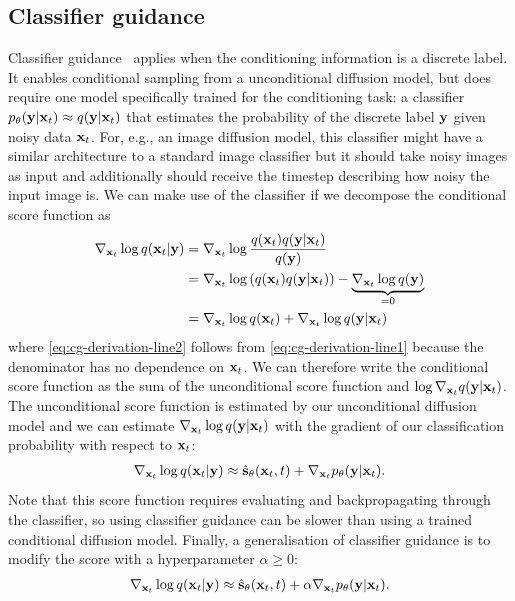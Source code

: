 \subsection{Classifier guidance}
Classifier guidance~\citep{song2020score} applies when the conditioning information is a discrete label. It enables conditional sampling from a unconditional diffusion model, but does require one model specifically trained for the conditioning task: a classifier $p_\theta({\mathbf{y}}|{\mathbf{x}}_t) \approx q({\mathbf{y}}|{\mathbf{x}}_t)$ that estimates the probability of the discrete label ${\mathbf{y}}$ given noisy data ${\mathbf{x}}_t$. For, e.g., an image diffusion model, this classifier might have a similar architecture to a standard image classifier but it should take noisy images as input and additionally should receive the timestep describing how noisy the input image is. We can make use of the classifier if we decompose the conditional score function as
\begin{align}
    \nabla_{{\mathbf{x}}_t} \log q({\mathbf{x}}_t|{\mathbf{y}}) &= \nabla_{{\mathbf{x}}_t} \log \frac{q({\mathbf{x}}_t)q({\mathbf{y}}|{\mathbf{x}}_t)}{q({\mathbf{y}})} \label{eq:cg-derivation-line1} \\
    &= \nabla_{{\mathbf{x}}_t} \log \left( q({\mathbf{x}}_t) q({\mathbf{y}}|{\mathbf{x}}_t) \right) - \underbrace{\nabla_{{\mathbf{x}}_t} \log q({\mathbf{y}})}_{=0}  \label{eq:cg-derivation-line2} \\
    &= \nabla_{{\mathbf{x}}_t} \log q({\mathbf{x}}_t) + \nabla_{{\mathbf{x}}_t} \log q({\mathbf{y}}|{\mathbf{x}}_t)  \label{eq:cg-derivation-line3}
\end{align}
where \cref{eq:cg-derivation-line2} follows from \cref{eq:cg-derivation-line1} because the denominator has no dependence on ${\mathbf{x}}_t$. We can therefore write the conditional score function as the sum of the unconditional score function and $\log \nabla_{{\mathbf{x}}_t} q({\mathbf{y}}|{\mathbf{x}}_t)$. The unconditional score function is estimated by our unconditional diffusion model and we can estimate $\nabla_{{\mathbf{x}}_t} \log q({\mathbf{y}}|{\mathbf{x}}_t)$ with the gradient of our classification probability with respect to ${\mathbf{x}}_t$:
\begin{align}
    \nabla_{{\mathbf{x}}_t} \log q({\mathbf{x}}_t|{\mathbf{y}}) \approx \hat{{\mathbf{s}}}_\theta({\mathbf{x}}_t, t) + \nabla_{{\mathbf{x}}_t} p_\theta({\mathbf{y}}|{\mathbf{x}}_t).
\end{align}
Note that this score function requires evaluating and backpropagating through the classifier, so using classifier guidance can be slower than using a trained conditional diffusion model. Finally, a generalisation of classifier guidance is to modify the score with a hyperparameter $\alpha \geq 0$:
\begin{align}
    \nabla_{{\mathbf{x}}_t} \log q({\mathbf{x}}_t|{\mathbf{y}}) \approx \hat{{\mathbf{s}}}_\theta({\mathbf{x}}_t, t) + \alpha \nabla_{{\mathbf{x}}_t} p_\theta({\mathbf{y}}|{\mathbf{x}}_t). \label{eq:cg-score-function}
\end{align}
